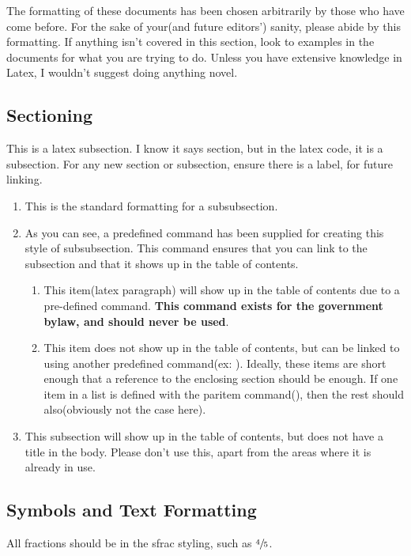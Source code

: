 The formatting of these documents has been chosen arbitrarily by those who have come before. 
For the sake of your(and future editors') sanity, please abide by this formatting.
If anything isn't covered in this section, look to examples in the documents for what you are trying to do.
Unless you have extensive knowledge in Latex, I wouldn't suggest doing anything novel.


\subsection{Sectioning} \label{II.1}
This is a latex subsection. I know it says section, but in the latex code, it is a subsection. For any new section or subsection, ensure there is a label, for future linking.
\begin{enumerate}
    \item {} This is the standard formatting for a subsubsection.
    \item {} 
    As you can see, a predefined command has been supplied for creating this style of subsubsection. 
    This command ensures that you can link to the subsection and that it shows up in the table of contents.
    \begin{enumerate}
        \item {} This item(latex paragraph) will show up in the table of contents due to a pre-defined command. \textbf{This command exists for the government bylaw, and should never be used}.
        \item \label{II.1.b.ii}This item does not show up in the table of contents, but can be linked to using another predefined command(ex: ). 
        Ideally, these items are short enough that a reference to the enclosing section should be enough. 
        If one item in a list is defined with the paritem command(), then the rest should also(obviously not the case here).
    \end{enumerate}
    \item {} \label{\thesubsubsection c}
    This subsection will show up in the table of contents, but does not have a title in the body. Please don't use this, apart from the areas where it is already in use.
\end{enumerate}

\subsection{Symbols and Text Formatting} \label{II.2}
All fractions should be in the sfrac styling, such as $\sfrac{4}{5}$.